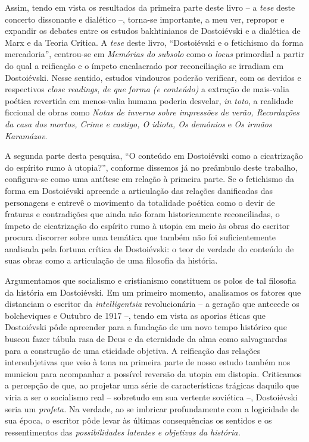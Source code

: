Assim, tendo em vista os resultados da primeira parte deste livro -- a
\emph{tese} deste concerto dissonante e dialético --, torna-se
importante, a meu ver, repropor e expandir os debates entre os estudos
bakhtinianos de Dostoiévski e a dialética de Marx e da Teoria Crítica. A
\emph{tese} deste livro, ``Dostoiévski e o fetichismo da forma
mercadoria'', centrou-se em \emph{Memórias do subsolo} como o
\emph{locus} primordial a partir do qual a reificação e o ímpeto
encalacrado por reconciliação se irradiam em Dostoiévski. Nesse sentido,
estudos vindouros poderão verificar, com os devidos e respectivos
\emph{close readings}, \emph{de que forma (e conteúdo)} a extração de
mais-valia poética revertida em menos-valia humana poderia desvelar,
\emph{in toto}, a realidade ficcional de obras como \emph{Notas de
inverno sobre impressões de verão, Recordações da casa dos mortos, Crime
e castigo, O idiota, Os demônios} e \emph{Os irmãos Karamázov}.

A segunda parte desta pesquisa, ``O conteúdo em Dostoiévski como a
cicatrização do espírito rumo à utopia?'', conforme dissemos já no
preâmbulo deste trabalho, configura-se como uma antítese em relação à
primeira parte. Se o fetichismo da forma em Dostoiévski apreende a
articulação das relações danificadas das personagens e entrevê o
movimento da totalidade poética como o devir de fraturas e contradições
que ainda não foram historicamente reconciliadas, o ímpeto de
cicatrização do espírito rumo à utopia em meio às obras do escritor
procura discorrer sobre uma temática que também não foi suficientemente
analisada pela fortuna crítica de Dostoiévski: o teor de verdade do
conteúdo de suas obras como a articulação de uma filosofia da história.

Argumentamos que socialismo e cristianismo constituem os polos de tal
filosofia da história em Dostoiévski. Em um primeiro momento, analisamos
os fatores que distanciam o escritor da \emph{intelligentsia}
revolucionária -- a geração que antecede os bolcheviques e Outubro de
1917 --, tendo em vista as aporias éticas que Dostoiévski pôde apreender
para a fundação de um novo tempo histórico que buscou fazer tábula rasa
de Deus e da eternidade da alma como salvaguardas para a construção de
uma eticidade objetiva. A reificação das relações intersubjetivas que
veio à tona na primeira parte de nosso estudo também nos municiou para
acompanhar a possível reversão da utopia em distopia. Criticamos a
percepção de que, ao projetar uma série de características trágicas
daquilo que viria a ser o socialismo real -- sobretudo em sua vertente
soviética --, Dostoiévski seria um \emph{profeta.} Na verdade, ao se
imbricar profundamente com a logicidade de sua época, o escritor pôde
levar às últimas consequências os sentidos e os ressentimentos das
\emph{possibilidades latentes e objetivas da história. }

